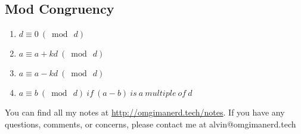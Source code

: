 \documentclass{math}
\begin{document}
\subsection*{Mod Congruency}
\begin{enumerate}
  \item \( d\equiv0\ (\bmod\ d) \) \\
  \item \( a\equiv a+kd\ (\bmod\ d) \) \\
  \item \( a\equiv a-kd\ (\bmod\ d) \) \\
  \item \( a\equiv b\ (\bmod\ d)\ if\ (a-b)\ is\ a\ multiple\ of\ d \)
\end{enumerate}

\begin{center}
  You can find all my notes at \url{http://omgimanerd.tech/notes}. If you have
  any questions, comments, or concerns, please contact me at
  alvin@omgimanerd.tech
\end{center}
\end{document}
